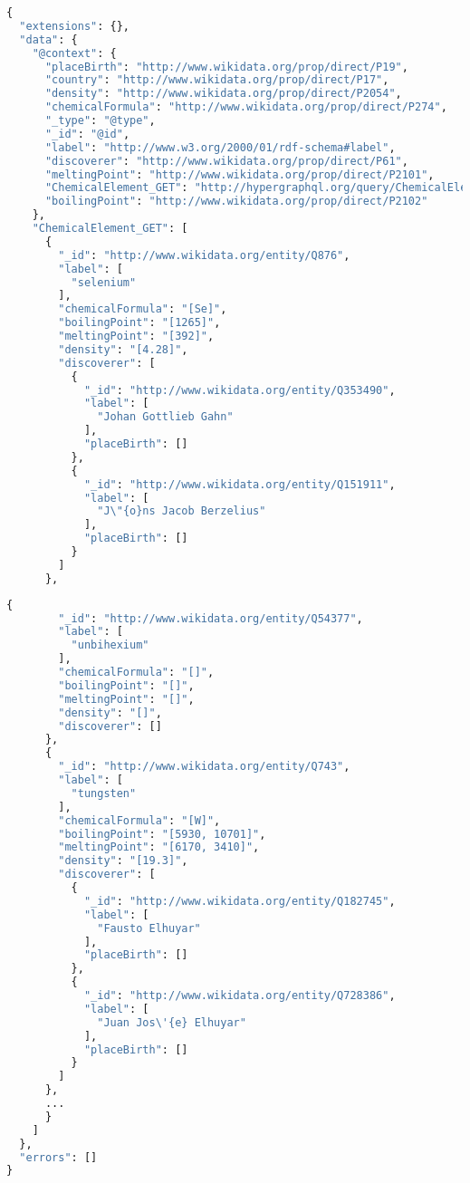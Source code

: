 \begin{minipage}{\linewidth}
\begin{lstlisting}[label=lst:34, language=GraphQL]
{
  "extensions": {},
  "data": {
    "@context": {
      "placeBirth": "http://www.wikidata.org/prop/direct/P19",
      "country": "http://www.wikidata.org/prop/direct/P17",
      "density": "http://www.wikidata.org/prop/direct/P2054",
      "chemicalFormula": "http://www.wikidata.org/prop/direct/P274",
      "_type": "@type",
      "_id": "@id",
      "label": "http://www.w3.org/2000/01/rdf-schema#label",
      "discoverer": "http://www.wikidata.org/prop/direct/P61",
      "meltingPoint": "http://www.wikidata.org/prop/direct/P2101",
      "ChemicalElement_GET": "http://hypergraphql.org/query/ChemicalElement_GET",
      "boilingPoint": "http://www.wikidata.org/prop/direct/P2102"
    },
    "ChemicalElement_GET": [
      {
        "_id": "http://www.wikidata.org/entity/Q876",
        "label": [
          "selenium"
        ],
        "chemicalFormula": "[Se]",
        "boilingPoint": "[1265]",
        "meltingPoint": "[392]",
        "density": "[4.28]",
        "discoverer": [
          {
            "_id": "http://www.wikidata.org/entity/Q353490",
            "label": [
              "Johan Gottlieb Gahn"
            ],
            "placeBirth": []
          },
          {
            "_id": "http://www.wikidata.org/entity/Q151911",
            "label": [
              "J\"{o}ns Jacob Berzelius"
            ],
            "placeBirth": []
          }
        ]
      },
\end{lstlisting}
\end{minipage}

\begin{minipage}{\linewidth}
\begin{lstlisting}[label=lst:34, caption={Results obtained}, language=GraphQL]
      {
        "_id": "http://www.wikidata.org/entity/Q54377",
        "label": [
          "unbihexium"
        ],
        "chemicalFormula": "[]",
        "boilingPoint": "[]",
        "meltingPoint": "[]",
        "density": "[]",
        "discoverer": []
      },
      {
        "_id": "http://www.wikidata.org/entity/Q743",
        "label": [
          "tungsten"
        ],
        "chemicalFormula": "[W]",
        "boilingPoint": "[5930, 10701]",
        "meltingPoint": "[6170, 3410]",
        "density": "[19.3]",
        "discoverer": [
          {
            "_id": "http://www.wikidata.org/entity/Q182745",
            "label": [
              "Fausto Elhuyar"
            ],
            "placeBirth": []
          },
          {
            "_id": "http://www.wikidata.org/entity/Q728386",
            "label": [
              "Juan Jos\'{e} Elhuyar"
            ],
            "placeBirth": []
          }
        ]
      },
	  ...
      }
    ]
  },
  "errors": []
}
\end{lstlisting}
\end{minipage}

